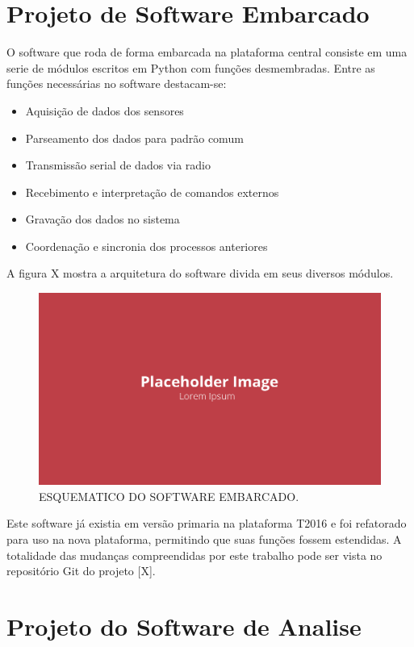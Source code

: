 \section{Projeto de Software Embarcado}

O software que roda de forma embarcada na plataforma central consiste em uma serie de módulos escritos em Python com funções desmembradas. Entre as funções necessárias no software destacam-se:

\begin{itemize}
    \item Aquisição de dados dos sensores
    \item Parseamento dos dados para padrão comum
    \item Transmissão serial de dados via radio
    \item Recebimento e interpretação de comandos externos
    \item Gravação dos dados no sistema
    \item Coordenação e sincronia dos processos anteriores
\end{itemize}

A figura X mostra a arquitetura do software divida em seus diversos módulos.

\begin{figure}[!ht]
    \centering
    \includegraphics[width=.8\linewidth]{figuras/outras/placeholder.png}
    \caption{ESQUEMATICO DO SOFTWARE EMBARCADO\cite{autor}.}
    \label{fig:esquematico_software_embarcado}
\end{figure}

Este software já existia em versão primaria na plataforma T2016 e foi refatorado para uso na nova plataforma, permitindo que suas funções fossem estendidas. A totalidade das mudanças compreendidas por este trabalho pode ser vista no repositório Git do projeto [X]. 
\section{Projeto do Software de Analise}

